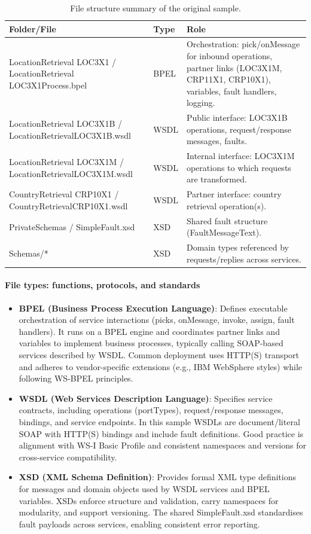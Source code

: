 \documentclass[11pt,a4paper]{article}
\begin{document}
\renewcommand{\arraystretch}{1.2}
\begin{longtable}{|>{\raggedright\arraybackslash}p{3.5cm}|>{\raggedright\arraybackslash}p{3.2cm}|>{\raggedright\arraybackslash}p{7.2cm}|}
\caption{File structure summary of the original sample.}\label{tab:file-structure}\\
\hline
\textbf{Folder/File} & \textbf{Type} & \textbf{Role} \\
\hline
LocationRetrieval LOC3X1 / LocationRetrieval LOC3X1Process.bpel & BPEL & Orchestration: pick/onMessage for inbound operations, partner links (LOC3X1M, CRP11X1, CRP10X1), variables, fault handlers, logging. \\
\hline
LocationRetrieval LOC3X1B / LocationRetrievalLOC3X1B.wsdl & WSDL & Public interface: LOC3X1B operations, request/response messages, faults. \\
\hline
LocationRetrieval LOC3X1M / LocationRetrievalLOC3X1M.wsdl & WSDL & Internal interface: LOC3X1M operations to which requests are transformed. \\
\hline
CountryRetrieval CRP10X1 / CountryRetrievalCRP10X1.wsdl & WSDL & Partner interface: country retrieval operation(s). \\
\hline
PrivateSchemas / SimpleFault.xsd & XSD & Shared fault structure (FaultMessageText). \\
\hline
Schemas/* & XSD & Domain types referenced by requests/replies across services. \\
\hline
\end{longtable}
\paragraph*{File types: functions, protocols, and standards}
\begin{itemize}
  \item \textbf{BPEL (Business Process Execution Language)}: Defines executable orchestration of service interactions (picks, onMessage, invoke, assign, fault handlers). It runs on a BPEL engine and coordinates partner links and variables to implement business processes, typically calling SOAP-based services described by WSDL. Common deployment uses HTTP(S) transport and adheres to vendor-specific extensions (e.g., IBM WebSphere styles) while following WS-BPEL principles.
  \item \textbf{WSDL (Web Services Description Language)}: Specifies service contracts, including operations (portTypes), request/response messages, bindings, and service endpoints. In this sample WSDLs are document/literal SOAP with HTTP(S) bindings and include fault definitions. Good practice is alignment with WS-I Basic Profile and consistent namespaces and versions for cross-service compatibility.
  \item \textbf{XSD (XML Schema Definition)}: Provides formal XML type definitions for messages and domain objects used by WSDL services and BPEL variables. XSDs enforce structure and validation, carry namespaces for modularity, and support versioning. The shared SimpleFault.xsd standardises fault payloads across services, enabling consistent error reporting.
\end{itemize}
\end{document}
